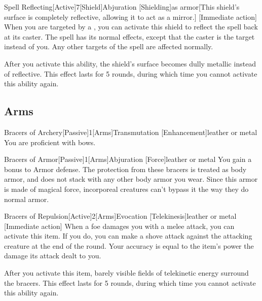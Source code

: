         \begin{magicitemdef}{Spell Reflecting}[Active]{7}[Shield]{Abjuration [Shielding]}{as armor}[This shield's surface is completely reflective, allowing it to act as a mirror.]
            [Immediate action] When you are targeted by a , you can activate this shield to reflect the spell back at its caster.
            The spell has its normal effects, except that the caster is the target instead of you.
            Any other targets of the spell are affected normally.

            After you activate this ability, the shield's surface becomes dully metallic instead of reflective.
            This effect lasts for 5 rounds, during which time you cannot activate this ability again.
        \end{magicitemdef}


    \subsection{Arms}

        \begin{magicitemdef}{Bracers of Archery}[Passive]{1}[Arms]{Transmutation [Enhancement]}{leather or metal}
             You are proficient with bows.
        \end{magicitemdef}

        \begin{magicitemdef}{Bracers of Armor}[Passive]{1}[Arms]{Abjuration [Force]}{leather or metal}
             You gain a  bonus to Armor defense.
            The protection from these bracers is treated as body armor, and does not stack with any other body armor you wear.
            Since this armor is made of magical force, incorporeal creatures can't bypass it the way they do normal armor.
        \end{magicitemdef}

        \begin{magicitemdef}{Bracers of Repulsion}[Active]{2}[Arms]{Evocation [Telekinesis]}{leather or metal}
            [Immediate action] When a foe damages you with a melee attack, you can activate this item.
            If you do, you can make a shove attack against the attacking creature at the end of the round.
            Your accuracy is equal to the item's power \add the damage its attack dealt to you.

            After you activate this item, barely visible fields of telekinetic energy surround the bracers.
            This effect lasts for 5 rounds, during which time you cannot activate this ability again.
        \end{magicitemdef}

